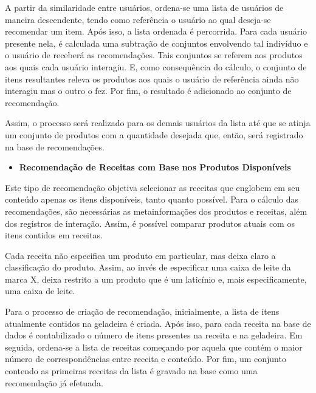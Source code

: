 A partir da similaridade entre usuários, ordena-se uma lista de usuários de maneira descendente, tendo como referência o usuário ao qual deseja-se recomendar um item.
Após isso, a lista ordenada é percorrida. Para cada usuário presente nela, é calculada uma subtração de conjuntos envolvendo tal indivíduo e o usuário de receberá as recomendações. Tais conjuntos se referem aos produtos aos quais cada usuário interagiu. E, como consequência do cálculo, o conjunto de itens resultantes releva os produtos aos quais o usuário de referência ainda não interagiu mas o outro o fez. Por fim, o resultado é adicionado ao conjunto de recomendação.

%
%
Assim, o processo será realizado para os demais usuários da lista até que se atinja um conjunto de produtos com a quantidade desejada que, então, será registrado na base de recomendações.

\begin{itemize}
    \item \textbf{Recomendação de Receitas com Base nos Produtos Disponíveis}
\end{itemize}

Este tipo de recomendação objetiva selecionar as receitas que englobem em seu conteúdo apenas os itens disponíveis, tanto quanto possível. Para o cálculo das recomendações, são necessárias as metainformações dos produtos e receitas, além dos registros de interação. Assim, é possível comparar produtos atuais com os itens contidos em receitas.

Cada receita não especifica um produto em particular, mas deixa claro a classificação do produto. Assim, ao invés de especificar uma caixa de leite da marca X, deixa restrito a um produto que é um laticínio e, mais especificamente, uma caixa de leite.

Para o processo de criação de recomendação, inicialmente, a lista de itens atualmente contidos na geladeira é criada. Após isso, para cada receita na base de dados é contabilizado o número de itens presentes na receita e na geladeira. Em seguida, ordena-se a lista de receitas começando por aquela que contém o maior número de correspondências entre receita e conteúdo. Por fim, um conjunto contendo as primeiras receitas da lista é gravado na base como uma recomendação já efetuada.

